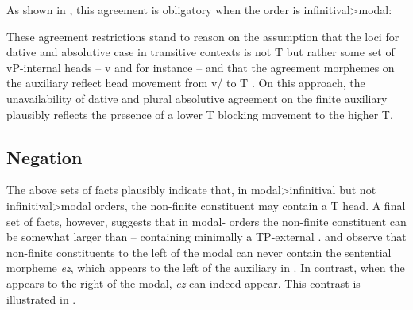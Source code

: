 \documentclass[output=paper]{langscibook}
\begin{document}
As shown in , this agreement is obligatory when the order is in\-fin\-i\-ti\-val>mo\-dal:
 
\ea \label{ex:haddican:25} 
        \citep{etxepare-uribeetxebarria2009}
\z\z 			
 
 
These agreement restrictions stand to reason on the assumption that the loci for dative and absolutive case in transitive contexts is not T but rather some set of vP-internal heads -- v and  for instance -- and that the agreement morphemes on the auxiliary reflect head movement from v/ to T \citep{arregi-molinaazaola2004, rezac2008}.  On this approach, the unavailability of dative and plural absolutive agreement on the finite auxiliary plausibly reflects the presence of a lower T blocking movement to the higher T.

\subsection{Negation}
 
The above sets of facts plausibly indicate that, in mo\-dal>in\-fin\-i\-ti\-val but not infinitival>\linebreak {}modal orders, the non-finite constituent may contain a T head.  A final set of facts, however, suggests that in modal- orders the non-finite constituent can be somewhat larger than  -- containing minimally a TP-external  . \cite{balza2010} and \cite{etxepare-uribeetxebarria2009} observe that non-finite constituents to the left of the modal can never contain the sentential  morpheme \textit{ez}, which appears to the left of the auxiliary in  \citep{Laka1990}.  In contrast, when the  appears to the right of the modal, \textit{ez} can indeed appear.  This contrast is illustrated in .  
 
\end{document}
